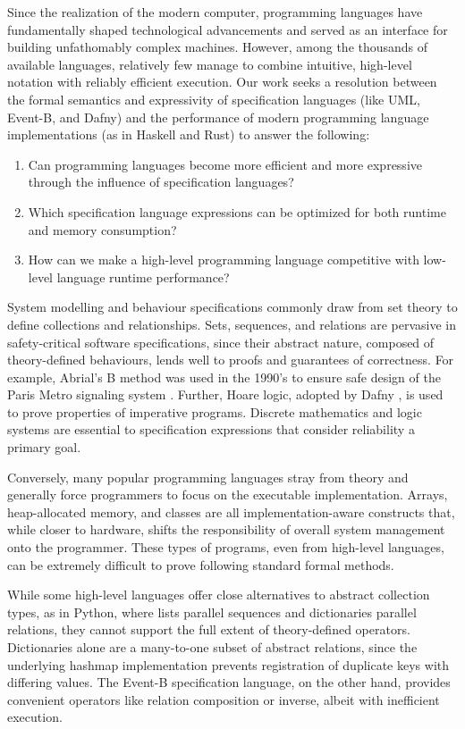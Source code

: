 \documentclass[12pt]{article}
\begin{document}
Since the realization of the modern computer, programming languages have fundamentally shaped technological advancements and served as an interface for building unfathomably complex machines. However, among the thousands of available languages, relatively few manage to combine intuitive, high-level notation with reliably efficient execution. Our work seeks a resolution between the formal semantics and expressivity of specification languages (like UML, Event-B, and Dafny) and the performance of modern programming language implementations (as in Haskell and Rust) to answer the following:
\begin{enumerate}
  \item Can programming languages become more efficient and more expressive through the influence of specification languages?
  \item Which specification language expressions can be optimized for both runtime and memory consumption?
  \item How can we make a high-level programming language competitive with low-level language runtime performance?
\end{enumerate}

System modelling and behaviour specifications commonly draw from set theory to define collections and relationships. Sets, sequences, and relations are pervasive in safety-critical software specifications, since their abstract nature, composed of theory-defined behaviours, lends well to proofs and guarantees of correctness. For example, Abrial's B method \cite{TODO} was used in the 1990's to ensure safe design of the Paris Metro signaling system \cite{TODO}. Further, Hoare logic, adopted by Dafny \cite{TODO}, is used to prove properties of imperative programs. Discrete mathematics and logic systems are essential to specification expressions that consider reliability a primary goal.

Conversely, many popular programming languages stray from theory and generally force programmers to focus on the executable implementation. Arrays, heap-allocated memory, and classes are all implementation-aware constructs that, while closer to hardware, shifts the responsibility of overall system management onto the programmer. These types of programs, even from high-level languages, can be extremely difficult to prove following standard formal methods.

While some high-level languages offer close alternatives to abstract collection types, as in Python, where lists parallel sequences and dictionaries parallel relations, they cannot support the full extent of theory-defined operators. Dictionaries alone are a many-to-one subset of abstract relations, since the underlying hashmap implementation prevents registration of duplicate keys with differing values. The Event-B specification language, on the other hand, provides convenient operators like relation composition or inverse, albeit with inefficient execution.
\end{document}
